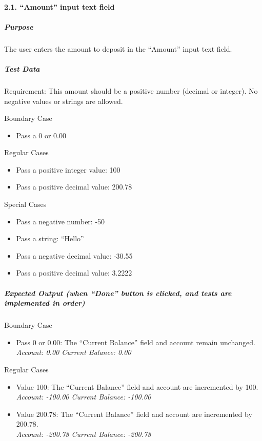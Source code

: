 \documentclass[12pt]{article}
\begin{document}
\paragraph{2.1. ``Amount'' input text field}
\subparagraph{Purpose} The user enters the amount to deposit in the ``Amount'' input text field.

\subparagraph{Test Data} Requirement: This amount should be a positive number (decimal or integer). No negative values or strings are allowed.

Boundary Case
\begin{itemize}
  \item Pass a 0 or 0.00
\end{itemize}

Regular Cases
\begin{itemize}
  \item Pass a positive integer value: 100
  \item Pass a positive decimal value: 200.78
\end{itemize}

Special Cases
\begin{itemize}
  \item Pass a negative number: -50
  \item Pass a string: ``Hello''
  \item Pass a negative decimal value: -30.55
  \item Pass a positive decimal value: 3.2222
\end{itemize}

\subparagraph{Expected Output (when ``Done'' button is clicked, and tests are implemented in order)}

Boundary Case
\begin{itemize}
  \item Pass 0 or 0.00: The ``Current Balance'' field and account remain unchanged.\\
{\it Account: 0.00 Current Balance: 0.00}
\end{itemize}

Regular Cases
\begin{itemize}
  \item Value 100: The ``Current Balance'' field and account are incremented by 100. 
{\it Account: -100.00 Current Balance: -100.00}
  \item Value 200.78: The ``Current Balance'' field and account are incremented by 200.78.\\
{\it Account: -200.78 Current Balance: -200.78}
\end{itemize}
\end{document}

